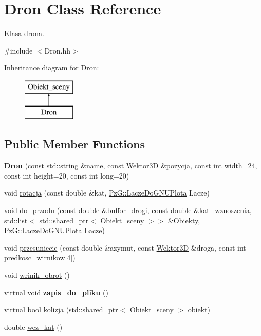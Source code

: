 \hypertarget{class_dron}{}\section{Dron Class Reference}
\label{class_dron}


Klasa drona.  




{\ttfamily \#include $<$Dron.\+hh$>$}

Inheritance diagram for Dron\+:\begin{figure}[H]
\begin{center}
\leavevmode
\includegraphics[height=2.000000cm]{class_dron}
\end{center}
\end{figure}
\subsection*{Public Member Functions}
\begin{DoxyCompactItemize}
\item 
\mbox{\label{class_dron_aa47a4c2d0fe914360b73a38b381765e4}} 
{\bfseries Dron} (const std\+::string \&name, const \mbox{\hyperlink{class_wektor}{Wektor3D}} \&pozycja, const int width=24, const int height=20, const int long=20)
\item 
void \mbox{\hyperlink{class_dron_a0ea228f96898dc3b6faa6849636333f3}{rotacja}} (const double \&kat, \mbox{\hyperlink{class_pz_g_1_1_lacze_do_g_n_u_plota}{Pz\+G\+::\+Lacze\+Do\+G\+N\+U\+Plota}} Lacze)
\item 
void \mbox{\hyperlink{class_dron_a9c676445fe100adedc65c65ea2f98866}{do\+\_\+przodu}} (const double \&buffor\+\_\+drogi, const double \&kat\+\_\+wznoszenia, std\+::list$<$ std\+::shared\+\_\+ptr$<$ \mbox{\hyperlink{class_obiekt__sceny}{Obiekt\+\_\+sceny}} $>$$>$ \&Obiekty, \mbox{\hyperlink{class_pz_g_1_1_lacze_do_g_n_u_plota}{Pz\+G\+::\+Lacze\+Do\+G\+N\+U\+Plota}} Lacze)
\item 
void \mbox{\hyperlink{class_dron_adccff890ab21226c99d3707ca5070d40}{przesuniecie}} (const double \&azymut, const \mbox{\hyperlink{class_wektor}{Wektor3D}} \&droga, const int predkosc\+\_\+wirnikow\mbox{[}4\mbox{]})
\item 
void \mbox{\hyperlink{class_dron_ae393be8215912f95339b3bb0c586c8cf}{wrinik\+\_\+obrot}} ()
\item 
\mbox{\label{class_dron_a69d1b5048e1c503928fbe774d043d8fa}} 
virtual void {\bfseries zapis\+\_\+do\+\_\+pliku} ()
\item 
virtual bool \mbox{\hyperlink{class_dron_a4cfd8ccac2031912be001b445e91e7e5}{kolizja}} (std\+::shared\+\_\+ptr$<$ \mbox{\hyperlink{class_obiekt__sceny}{Obiekt\+\_\+sceny}} $>$ obiekt)
\item 
double \mbox{\hyperlink{class_dron_a0e17db391f41adf89bd72e6b78e35d39}{wez\+\_\+kat}} ()
\end{DoxyCompactItemize}
